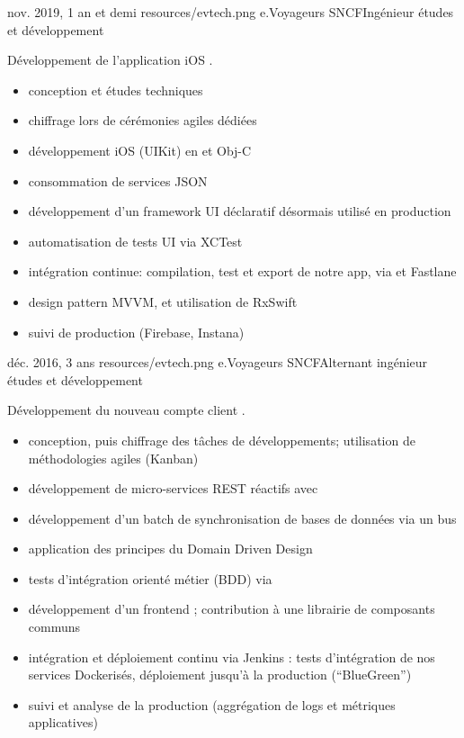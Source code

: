 \documentclass{cv}
\begin{document}
\experience
{{nov. 2019,  1 an et demi}}
{resources/evtech.png}
{e.Voyageurs SNCF}{Ingénieur études et développement}{

Développement de l'application iOS \href{https://apps.apple.com/fr/app/oui-sncf-train-et-bus/id343889987}{\link{\ouisncf{}}}.

\begin{itemize}
	\item conception et études techniques
	\item chiffrage lors de cérémonies agiles dédiées
	\item développement iOS (UIKit) en  et Obj-C
	\item consommation de services JSON
	\item développement d'un framework UI déclaratif désormais utilisé en production
	\item automatisation de tests UI via XCTest
	\item intégration continue: compilation, test et export de notre app, via  et Fastlane
	\item design pattern MVVM, et utilisation de RxSwift
	\item suivi de production (Firebase, Instana)
\end{itemize}
}

\experience
{{déc. 2016,  3 ans}}
{resources/evtech.png}
{e.Voyageurs SNCF}{Alternant ingénieur études et développement}{

Développement du nouveau compte client \ouisncf{}.	

\begin{itemize}
	\item conception, puis chiffrage des tâches de développements; utilisation de méthodologies agiles (Kanban)
	\item développement de micro-services REST réactifs avec 
	\item développement d'un batch de synchronisation de bases de données via un bus 
	\item application des principes du Domain Driven Design
	\item tests d'intégration orienté métier (BDD) via 
	\item développement d'un frontend ; contribution à une librairie de composants communs
	\item intégration et déploiement continu via Jenkins : tests d'intégration de nos services Dockerisés, 
	déploiement jusqu'à la production (``BlueGreen'')
	\item suivi et analyse de la production (aggrégation de logs et métriques applicatives)
\end{itemize}
}
\end{document}
